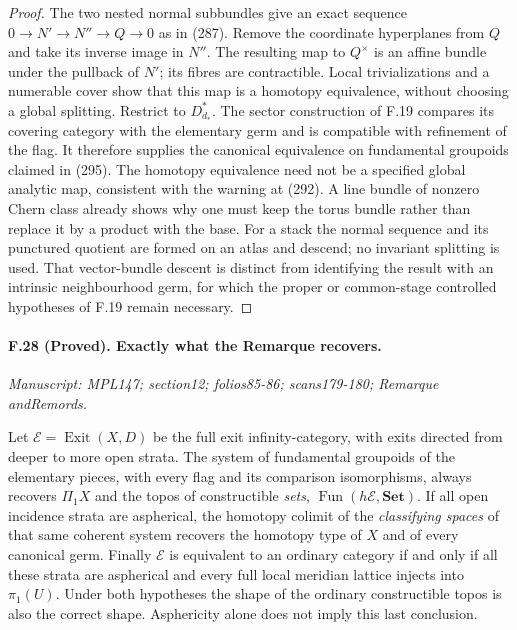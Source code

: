 \begin{proof}
The two nested normal subbundles give an exact sequence
$0\to N'\to N''\to Q\to0$ as in (287). Remove the coordinate
hyperplanes from $Q$ and take its inverse image in $N''$.
The resulting map to $Q^\times$ is an affine bundle under the
pullback of $N'$; its fibres are contractible. Local trivializations
and a numerable cover show that this map is a homotopy equivalence,
without choosing a global splitting. Restrict to $D_{d_*}^*$.
The sector construction of F.19 compares its covering category with
the elementary germ and is compatible with refinement of the flag.
It therefore supplies the canonical equivalence on fundamental
groupoids claimed in (295). The homotopy equivalence need not be
a specified global analytic map, consistent with the warning at
(292). A line bundle of nonzero Chern class already shows why one
must keep the torus bundle rather than replace it by a product with
the base. For a stack the normal sequence and its punctured quotient
are formed on an atlas and descend; no invariant splitting is used.
That vector-bundle descent is distinct from identifying the result
with an intrinsic neighbourhood germ, for which the proper or
common-stage controlled hypotheses of F.19 remain necessary.
\end{proof}

\paragraph{F.28 (Proved). Exactly what the Remarque recovers.}
\textit{Manuscript: MPL147; section12; folios85-86; scans179-180; Remarque andRemords.}

Let $\mathcal E=\operatorname{Exit}(X,D)$ be the full exit
infinity-category, with exits directed from deeper to more open
strata. The system of fundamental groupoids of the elementary
pieces, with every flag and its comparison isomorphisms, always
recovers $\Pi_1X$ and the topos of constructible \emph{sets},
$\operatorname{Fun}(h\mathcal E,\mathbf{Set})$.
If all open incidence strata are aspherical, the homotopy colimit
of the \emph{classifying spaces} of that same coherent system
recovers the homotopy type of $X$ and of every canonical germ.
Finally $\mathcal E$ is equivalent to an ordinary category if and
only if all these strata are aspherical and every full local
meridian lattice injects into $\pi_1(U)$. Under both hypotheses the
shape of the ordinary constructible topos is also the correct shape.
Asphericity alone does not imply this last conclusion.


